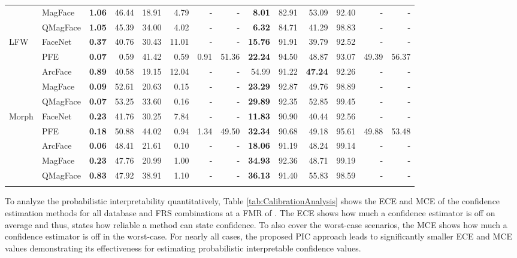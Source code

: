 \documentclass[10pt,twocolumn,letterpaper]{article}
\begin{document}
\begin{table*}[ht]
\begin{tabular}{llrrrrrrrrrrrr}
           & MagFace  & \textbf{1.06}       & 46.44 & 18.91 & 4.79  & -    & -     & \textbf{8.01}       & 82.91 & 53.09 & 92.40 & -      & -     \\
           & QMagFace & \textbf{1.05}       & 45.39 & 34.00 & 4.02  & -    & -     & \textbf{6.32}       & 84.71 & 41.29 & 98.83 & -      & -     \\
\hline
LFW        & FaceNet  & \textbf{0.37}       & 40.76 & 30.43 & 11.01 & -    & -     & \textbf{15.76}      & 91.91 & 39.79 & 92.52 & -      & -     \\
           & PFE      & \textbf{0.07}       & 0.59  & 41.42 & 0.59  & 0.91 & 51.36 & \textbf{22.24}      & 94.50 & 48.87 & 93.07 & 49.39  & 56.37 \\
           & ArcFace  & \textbf{0.89}       & 40.58 & 19.15 & 12.04 & -    & -     & 54.99      & 91.22 & \textbf{47.24} & 92.26 & -      & -     \\
           & MagFace  & \textbf{0.09}       & 52.61 & 20.63 & 0.15  & -    & -     & \textbf{23.29}      & 92.87 & 49.76 & 98.89 & -      & -     \\
           & QMagFace & \textbf{0.07}       & 53.25 & 33.60 & 0.16  & -    & -     & \textbf{29.89}      & 92.35 & 52.85 & 99.45 & -      & -     \\
\hline
Morph      & FaceNet  & \textbf{0.23}       & 41.76 & 30.25 & 7.84  & -    & -     & \textbf{11.83}      & 90.90 & 40.44 & 92.56 & -      & -     \\
           & PFE      & \textbf{0.18}       & 50.88 & 44.02 & 0.94  & 1.34 & 49.50 & \textbf{32.34}      & 90.68 & 49.18 & 95.61 & 49.88  & 53.48 \\
           & ArcFace  & \textbf{0.06}       & 48.41 & 21.61 & 0.10  & -    & -     & \textbf{18.06}      & 91.19 & 48.24 & 99.14 & -      & -     \\
           & MagFace  & \textbf{0.23}       & 47.76 & 20.99 & 1.00  & -    & -     & \textbf{34.93}      & 92.36 & 48.71 & 99.19 & -      & -     \\
           & QMagFace & \textbf{0.83}       & 47.92 & 38.91 & 1.10  & -    & -     & \textbf{36.13}      & 91.40 & 55.83 & 98.59 & -      & -     \\
\Xhline{2\arrayrulewidth}
\end{tabular}
\end{table*}



To analyze the probabilistic interpretability quantitatively, Table \ref{tab:CalibrationAnalysis} shows the ECE and MCE of the confidence estimation methods for all database and FRS combinations at a FMR of .
The ECE shows how much a confidence estimator is off on average and thus, states how reliable a method can state confidence.
To also cover the worst-case scenarios, the MCE shows how much a confidence estimator is off in the worst-case.
For nearly all cases, the proposed PIC approach leads to significantly smaller ECE and MCE values demonstrating its effectiveness for estimating probabilistic interpretable confidence values.
\end{document}
